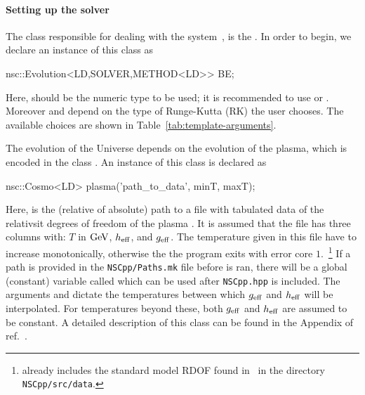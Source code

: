 \documentclass[11pt,a4paper]{article}
\begin{document}
\paragraph{Setting up the solver}
%
The class responsible for dealing with the system~, is the . In order to begin, we declare an instance of this class as
%
\begin{cpp}
    nsc::Evolution<LD,SOLVER,METHOD<LD>> BE;
\end{cpp}
%
Here,  should be the numeric type to be used; it is recommended to use  or . Moreover  and  depend on the type of Runge-Kutta (RK) the user chooses. The available choices are shown in Table~\ref{tab:template-arguments}. 

The evolution of the Universe depends on the evolution of the plasma, which is encoded in the class . An instance of this class is declared as 
%
\begin{cpp}
	nsc::Cosmo<LD> plasma('path_to_data', minT, maxT);
\end{cpp}
%
Here,  is the (relative of absolute) path to a file with tabulated data  of the relativsit degrees of freedom of the plasma . It is assumed that the file has three columns with: $T$ in ${\rm GeV}$, $h_{\rm eff}{}$, and $g_{\rm eff}{}$. The temperature given in this file have to increase monotonically, otherwise the the program exits with error core $1$.~\footnote{\nsc already includes the standard model RDOF found in~\cite{Saikawa:2020swg} in the directory {\tt NSCpp/src/data}.} If a path is provided in the {\tt NSCpp/Paths.mk} file before  is ran, there will be a global (constant) variable called  which can be used after  {\tt NSCpp.hpp} is included.
%
The arguments  and  dictate the temperatures between which $g_{\rm eff}{}$ and $h_{\rm eff}{}$ will be interpolated. For temperatures beyond these, both  $g_{\rm eff}{}$ and $h_{\rm eff}{}$  are assumed to be constant. A detailed description of this class can be found in the Appendix of ref.~\cite{Karamitros:2021nxi}.  
\end{document}
